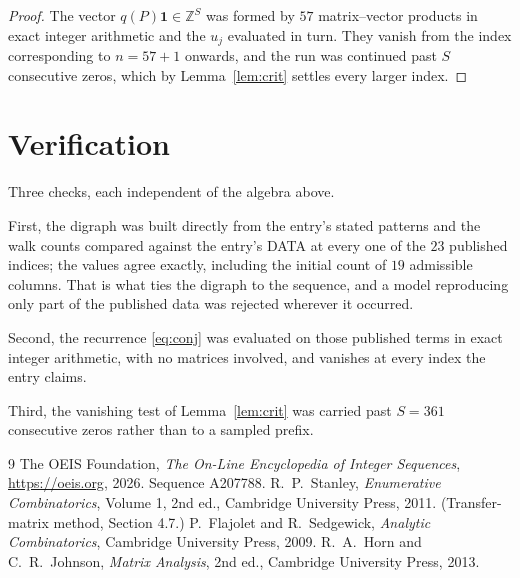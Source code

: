 \documentclass[11pt,a4paper]{article}
\theoremstyle{plain}
\theoremstyle{definition}
\begin{document}
\begin{proof}
The vector $q(P)\mathbf{1}\in\mathbb{Z}^{S}$ was formed by $57$ matrix--vector
products in exact integer arithmetic and the $u_j$ evaluated in turn. They vanish from the
index corresponding to $n=57+1$ onwards, and the run was continued past $S$ consecutive
zeros, which by Lemma~\ref{lem:crit} settles every larger index.
\end{proof}

\section{Verification}

Three checks, each independent of the algebra above.

First, the digraph was built directly from the entry's stated patterns and the walk counts
compared against the entry's DATA at every one of the $23$ published indices; the
values agree exactly, including the initial count of $19$ admissible columns. That is
what ties the digraph to the sequence, and a model reproducing only part of the published
data was rejected wherever it occurred.

Second, the recurrence \eqref{eq:conj} was evaluated on those published terms in exact
integer arithmetic, with no matrices involved, and vanishes at every index the entry claims.

Third, the vanishing test of Lemma~\ref{lem:crit} was carried past $S=361$ consecutive
zeros rather than to a sampled prefix.

\begin{thebibliography}{9}
 The OEIS Foundation, \emph{The On-Line Encyclopedia of Integer
Sequences}, \url{https://oeis.org}, 2026. Sequence A207788.
 R.~P.~Stanley, \emph{Enumerative Combinatorics}, Volume 1, 2nd ed.,
Cambridge University Press, 2011. (Transfer-matrix method, Section 4.7.)
 P.~Flajolet and R.~Sedgewick, \emph{Analytic Combinatorics}, Cambridge
University Press, 2009.
 R.~A.~Horn and C.~R.~Johnson, \emph{Matrix Analysis}, 2nd ed., Cambridge
University Press, 2013.
\end{thebibliography}
\end{document}
